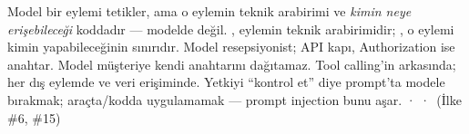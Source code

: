 
 Model bir eylemi tetikler, ama o eylemin teknik arabirimi ve
\emph{kimin neye erişebileceği} koddadır --- modelde değil.
 , eylemin teknik arabirimidir; , o
eylemi kimin yapabileceğinin sınırıdır.
 Model resepsiyonist; API kapı, Authorization ise anahtar. Model
müşteriye kendi anahtarını dağıtamaz.
 Tool calling'in arkasında; her dış eylemde ve veri erişiminde.
 Yetkiyi ``kontrol et'' diye prompt'ta modele bırakmak; araçta/kodda uygulamamak ---
prompt injection bunu aşar.
  ·  ·  \,{\scriptsize\color{softgray}(İlke \#6, \#15)}

